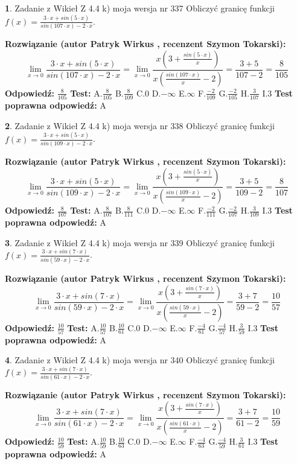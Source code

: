 \documentclass[12pt, a4paper]{article}
\theoremstyle{definition} %
\newtheorem{zad}{}
\newcommand{\zadStart}[1]{\begin{zad}#1\newline}
\newcommand{\zadStop}{\end{zad}}
\newcommand{\rozwStart}[2]{\noindent \textbf{Rozwiązanie (autor #1 , recenzent #2): }\newline}
\newcommand{\rozwStop}{\newline}
\newcommand{\odpStart}{\noindent \textbf{Odpowiedź:}\newline}
\newcommand{\odpStop}{\newline}
\newcommand{\testStart}{\noindent \textbf{Test:}\newline}
\newcommand{\testStop}{\newline}
\newcommand{\kluczStart}{\noindent \textbf{Test poprawna odpowiedź:}\newline}
\newcommand{\kluczStop}{\newline}
\begin{document}
\zadStart{Zadanie z Wikieł Z 4.4 k) moja wersja nr 337}
Obliczyć granicę funkcji $f(x)=\frac{3\cdot x +sin(5\cdot x)}{sin(107\cdot x) -2\cdot x}$.
\zadStop
\rozwStart{Patryk Wirkus}{Szymon Tokarski}
$$\lim\limits_{x\to 0}\frac{3\cdot x +sin(5\cdot x)}{sin(107\cdot x) -2\cdot x}
=\lim\limits_{x\to 0}\frac{x(3+\frac{sin(5\cdot x)}{x})}{x(\frac{sin(107\cdot x)}{x}-2)}
=\frac{3+5}{107-2} = \frac{8}{105}$$
\rozwStop
\odpStart
$\frac{8}{105}$
\odpStop
\testStart
A.$\frac{8}{105}$
B.$\frac{8}{109}$
C.$0$
D.$-\infty$
E.$\infty$
F.$\frac{-2}{109}$
G.$\frac{-2}{105}$
H.$\frac{3}{107}$
I.$3$
\testStop
\kluczStart
A
\kluczStop



\zadStart{Zadanie z Wikieł Z 4.4 k) moja wersja nr 338}
Obliczyć granicę funkcji $f(x)=\frac{3\cdot x +sin(5\cdot x)}{sin(109\cdot x) -2\cdot x}$.
\zadStop
\rozwStart{Patryk Wirkus}{Szymon Tokarski}
$$\lim\limits_{x\to 0}\frac{3\cdot x +sin(5\cdot x)}{sin(109\cdot x) -2\cdot x}
=\lim\limits_{x\to 0}\frac{x(3+\frac{sin(5\cdot x)}{x})}{x(\frac{sin(109\cdot x)}{x}-2)}
=\frac{3+5}{109-2} = \frac{8}{107}$$
\rozwStop
\odpStart
$\frac{8}{107}$
\odpStop
\testStart
A.$\frac{8}{107}$
B.$\frac{8}{111}$
C.$0$
D.$-\infty$
E.$\infty$
F.$\frac{-2}{111}$
G.$\frac{-2}{107}$
H.$\frac{3}{109}$
I.$3$
\testStop
\kluczStart
A
\kluczStop



\zadStart{Zadanie z Wikieł Z 4.4 k) moja wersja nr 339}
Obliczyć granicę funkcji $f(x)=\frac{3\cdot x +sin(7\cdot x)}{sin(59\cdot x) -2\cdot x}$.
\zadStop
\rozwStart{Patryk Wirkus}{Szymon Tokarski}
$$\lim\limits_{x\to 0}\frac{3\cdot x +sin(7\cdot x)}{sin(59\cdot x) -2\cdot x}
=\lim\limits_{x\to 0}\frac{x(3+\frac{sin(7\cdot x)}{x})}{x(\frac{sin(59\cdot x)}{x}-2)}
=\frac{3+7}{59-2} = \frac{10}{57}$$
\rozwStop
\odpStart
$\frac{10}{57}$
\odpStop
\testStart
A.$\frac{10}{57}$
B.$\frac{10}{61}$
C.$0$
D.$-\infty$
E.$\infty$
F.$\frac{-4}{61}$
G.$\frac{-4}{57}$
H.$\frac{3}{59}$
I.$3$
\testStop
\kluczStart
A
\kluczStop



\zadStart{Zadanie z Wikieł Z 4.4 k) moja wersja nr 340}
Obliczyć granicę funkcji $f(x)=\frac{3\cdot x +sin(7\cdot x)}{sin(61\cdot x) -2\cdot x}$.
\zadStop
\rozwStart{Patryk Wirkus}{Szymon Tokarski}
$$\lim\limits_{x\to 0}\frac{3\cdot x +sin(7\cdot x)}{sin(61\cdot x) -2\cdot x}
=\lim\limits_{x\to 0}\frac{x(3+\frac{sin(7\cdot x)}{x})}{x(\frac{sin(61\cdot x)}{x}-2)}
=\frac{3+7}{61-2} = \frac{10}{59}$$
\rozwStop
\odpStart
$\frac{10}{59}$
\odpStop
\testStart
A.$\frac{10}{59}$
B.$\frac{10}{63}$
C.$0$
D.$-\infty$
E.$\infty$
F.$\frac{-4}{63}$
G.$\frac{-4}{59}$
H.$\frac{3}{61}$
I.$3$
\testStop
\kluczStart
A
\kluczStop
\end{document}
